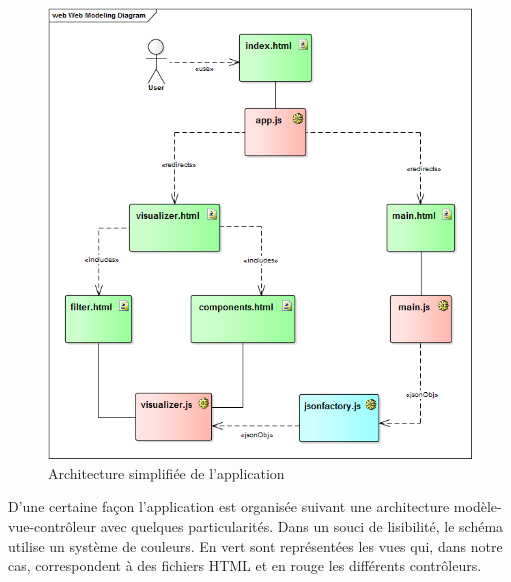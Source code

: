 \documentclass [a4paper,11pt]{article}
\begin{document}
\begin{figure}[!h]
\centering
\includegraphics[scale=0.5]{img/ped_architecture.png}
\caption[Résultats]{Architecture simplifiée de l'application}
\end{figure}

D’une certaine façon l’application est organisée suivant une architecture modèle-vue-contrôleur avec quelques particularités. Dans un souci de lisibilité, le schéma utilise un système de couleurs. En vert sont représentées les vues qui, dans notre cas, correspondent à des fichiers HTML et en rouge les différents contrôleurs.\newline

  
\end{document}
